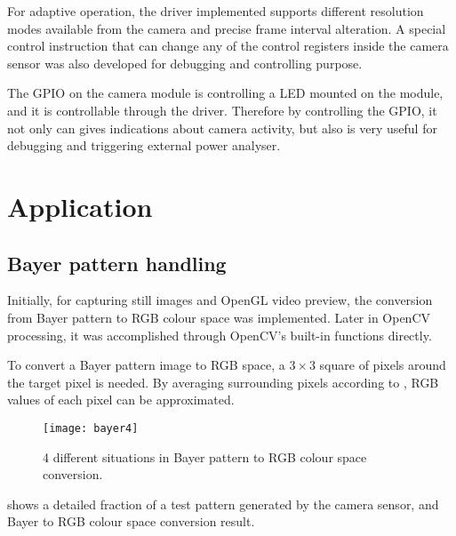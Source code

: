 For adaptive operation, the driver implemented supports different resolution modes available from the camera and precise frame interval alteration. A special control instruction that can change any of the control registers inside the camera sensor was also developed for debugging and controlling purpose.

The GPIO on the camera module is controlling a LED mounted on the module, and it is controllable through the driver. Therefore by controlling the GPIO, it not only can gives indications about camera activity, but also is very useful for debugging and triggering external power analyser.

\section{Application}


\subsection{Bayer pattern handling}

Initially, for capturing still images and OpenGL video preview, the conversion from Bayer pattern to RGB colour space was implemented. Later in OpenCV processing, it was accomplished through OpenCV's built-in functions directly.

To convert a Bayer pattern image to RGB space, a $3 \times 3$ square of pixels around the target pixel is needed. By averaging surrounding pixels according to , RGB values of each pixel can be approximated.

\begin{figure}[H]
  \centering
  \texttt{[image: bayer4]}
  \caption{4 different situations in Bayer pattern to RGB colour space conversion.}
  \label{imp:bayer4}
\end{figure}

 shows a detailed fraction of a test pattern generated by the camera sensor, and Bayer to RGB colour space conversion result.

